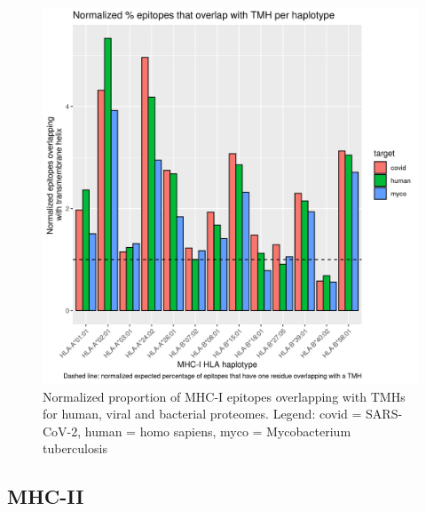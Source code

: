\begin{figure}[!htbp]
  \includegraphics[width=\textwidth]{bbbq_1_smart_results/fig_f_tmh_mhc1_2_normalized.png}
  \caption{
    Normalized proportion of MHC-I epitopes overlapping with TMHs
    for human, viral and bacterial proteomes.
    Legend: covid = SARS-CoV-2,
    human = homo sapiens, myco = Mycobacterium tuberculosis
  }
  \label{fig:f_tmh_mhc1_normalized}
\end{figure}



\subsection{MHC-II}

